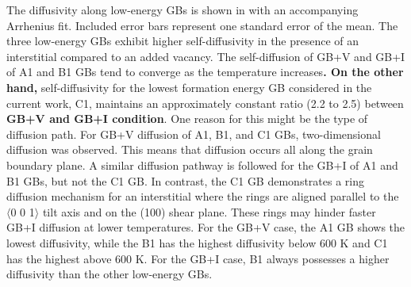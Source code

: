 \documentclass[review]{elsarticle}
\providecommand{\DIFaddtex}[1]{{\bf #1}} %
\providecommand{\DIFdeltex}[1]{} %
\providecommand{\DIFaddbegin}{\protect\color{blue}} %
\providecommand{\DIFaddend}{\protect\color{black}} %
\providecommand{\DIFdelbegin}{\protect\color{red}} %
\providecommand{\DIFdelend}{\protect\color{black}} %
\providecommand{\DIFadd}[1]{\texorpdfstring{\DIFaddtex{#1}}{#1}} %
\providecommand{\DIFdel}[1]{\texorpdfstring{\DIFdeltex{#1}}{}} %
\newcommand{\DIFscaledelfig}{0.5}
\newlength{\DIFdelgraphicswidth} %
\newlength{\DIFdelgraphicsheight} %
\newcommand{\DIFaddincludegraphics}[2][]{{\color{blue}\fbox{\DIFOincludegraphics[#1]{#2}}}} %
\newcommand{\DIFdelincludegraphics}[2][]{%
\sbox{\DIFdelgraphicsbox}{\DIFOincludegraphics[#1]{#2}}%
\settoboxwidth{\DIFdelgraphicswidth}{\DIFdelgraphicsbox} %
\settoboxtotalheight{\DIFdelgraphicsheight}{\DIFdelgraphicsbox} %
\scalebox{\DIFscaledelfig}{%
\parbox[b]{\DIFdelgraphicswidth}{\usebox{\DIFdelgraphicsbox}\\[-\baselineskip] \rule{\DIFdelgraphicswidth}{0em}}\llap{\resizebox{\DIFdelgraphicswidth}{\DIFdelgraphicsheight}{%
\setlength{\unitlength}{\DIFdelgraphicswidth}%
\begin{picture}(1,1)%
\thicklines\linethickness{2pt} %
{\color[rgb]{1,0,0}\put(0,0){\framebox(1,1){}}}%
{\color[rgb]{1,0,0}\put(0,0){\line( 1,1){1}}}%
{\color[rgb]{1,0,0}\put(0,1){\line(1,-1){1}}}%
\end{picture}%
}\hspace*{3pt}}} %
} %
\DeclareRobustCommand{\DIFaddbegin}{\DIFOaddbegin \let\includegraphics\DIFaddincludegraphics} %
\DeclareRobustCommand{\DIFaddend}{\DIFOaddend \let\includegraphics\DIFOincludegraphics} %
\DeclareRobustCommand{\DIFdelbegin}{\DIFOdelbegin \let\includegraphics\DIFdelincludegraphics} %
\DeclareRobustCommand{\DIFdelend}{\DIFOaddend \let\includegraphics\DIFOincludegraphics} %
\begin{document}
\par The diffusivity along low-energy GBs is shown in  with an accompanying Arrhenius fit. Included error bars represent one standard error of the mean. The three low-energy GBs exhibit higher self-diffusivity in the presence of an interstitial compared to an added vacancy. The self-diffusion of GB+V and GB+I of A1 and B1 GBs tend to converge as the temperature increases\DIFdelbegin \DIFdel{, while }\DIFdelend \DIFaddbegin \DIFadd{. On the other hand, }\DIFaddend self-diffusivity for the lowest formation energy GB considered in the current work, C1, maintains an approximately constant ratio (2.2 to 2.5) between \DIFdelbegin \DIFdel{the two defect cases}\DIFdelend \DIFaddbegin \DIFadd{GB+V and GB+I condition}\DIFaddend . One reason for this might be the type of diffusion path. For GB+V diffusion of A1, B1, and C1 GBs, two-dimensional diffusion was observed. This means that diffusion occurs all along the grain boundary plane. A similar diffusion pathway is followed for the GB+I of A1 and B1 GBs, but not the C1 GB. In contrast, the C1 GB demonstrates a ring diffusion mechanism for an interstitial where the rings are aligned parallel to the $\langle$0 0 1$\rangle$ tilt axis and on the (100) shear plane. These rings may hinder faster GB+I diffusion at lower temperatures. For the GB+V case, the A1 GB shows the lowest diffusivity, while the B1 has the highest diffusivity below 600 K and C1 has the highest above 600 K. For the GB+I case, B1 always possesses a higher diffusivity than the other low-energy GBs. 
\end{document}
